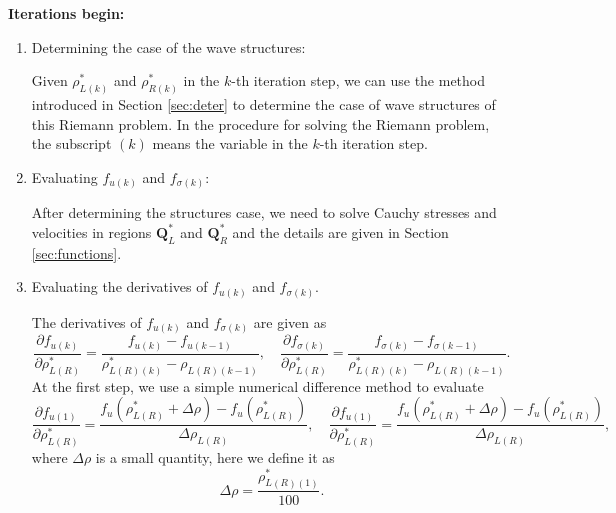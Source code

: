 \documentclass{article}
\numberwithin{equation}{section}
\numberwithin{table}{section}
\begin{document}
\noindent
\textbf{Iterations begin:}
\begin{enumerate}[Step 1]
  \item Determining the case of the wave structures:

	Given $\rho _{L(k)}^*$ and  $\rho _{R(k)}^*$ in the $k$-th  iteration step, we can use the method introduced in Section \ref{sec:deter} to determine the case of wave structures of this Riemann problem. In the  procedure for solving the  Riemann problem, the subscript $(k)$ means the variable in the $k$-th  iteration step.

  \item Evaluating $f_{u(k)}$ and $f_{\sigma(k)}$:

  After determining the structures case, we need  to solve  Cauchy stresses and velocities in regions $\mathbf{Q}^*_L$ and $\mathbf{Q}^*_R$ and the details are given in Section \ref{sec:functions}.

  \item Evaluating the derivatives of $f_{u(k)}$ and $f_{\sigma(k)}$.

The derivatives of $f_{u(k)}$ and $f_{\sigma(k)}$ are given as
\begin{equation}
  \frac{\partial f_{u(k)}}{\partial \rho^*_{L(R)}} = \frac{f_{u(k)}-f_{u(k-1)}}{\rho_{L(R)(k)}^* - \rho_{L(R)(k-1)}},\quad
  \frac{\partial f_{\sigma(k)}}{\partial \rho^*_{L(R)}} = \frac{f_{\sigma(k)}-f_{\sigma(k-1)}}{\rho_{L(R)(k)}^* - \rho_{L(R)(k-1)}}.
\end{equation}
At the first step, we use a simple  numerical difference  method to evaluate
\begin{equation}
  \frac{\partial f_{u(1)}}{\partial \rho^*_{L(R)}} = \frac{f_{u}(\rho^*_{L(R)}+\Delta \rho)-f_{u}(\rho^*_{L(R)})}{\Delta \rho_{L(R)}},\quad
  \frac{\partial f_{u(1)}}{\partial \rho^*_{L(R)}} = \frac{f_{u}(\rho^*_{L(R)}+\Delta \rho)-f_{u}(\rho^*_{L(R)})}{\Delta \rho_{L(R)}},
\end{equation}
where $\Delta \rho$ is a small quantity, here we define it as
\begin{equation}
  \Delta \rho = \frac{\rho_{L(R)(1)}^*}{100}.
\end{equation}


\end{enumerate}
\end{document}
